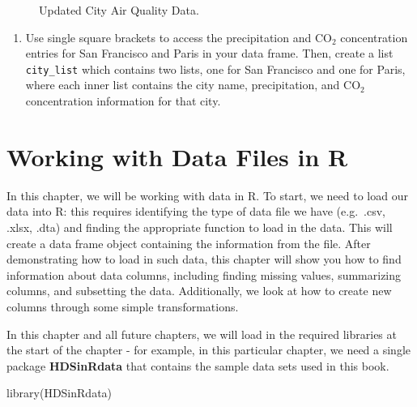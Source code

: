 \documentclass[
  letterpaper,
]{krantz}
\makeatletter
\newenvironment{Shaded}{\begin{snugshade}}{\end{snugshade}}
\newcommand{\FunctionTok}[1]{\textcolor[rgb]{0.28,0.35,0.67}{#1}}
\newcommand{\NormalTok}[1]{\textcolor[rgb]{0.00,0.23,0.31}{#1}}
\providecommand{\tightlist}{%
  \setlength{\itemsep}{0pt}\setlength{\parskip}{0pt}}\usepackage{longtable,booktabs,array}
\newenvironment{kframe}{%
\medskip{}
\setlength{\fboxsep}{.8em}
 \def\at@end@of@kframe{}%
 \ifinner\ifhmode%
  \def\at@end@of@kframe{\end{minipage}}%
  \begin{minipage}{\columnwidth}%
 \fi\fi%
 \def\FrameCommand##1{\hskip\@totalleftmargin \hskip-\fboxsep
 \colorbox{shadecolor}{##1}\hskip-\fboxsep
     \hskip-\linewidth \hskip-\@totalleftmargin \hskip\columnwidth}%
 \MakeFramed {\advance\hsize-\width
   \@totalleftmargin\z@ \linewidth\hsize
   \@setminipage}}%
 {\par\unskip\endMakeFramed%
 \at@end@of@kframe}
\renewenvironment{Shaded}{\begin{kframe}}{\end{kframe}}
\makeatother
\begin{document}
\begin{figure}


\caption{\label{fig-city-air-quality-2}Updated City Air Quality Data.}

\end{figure}%

\begin{enumerate}
\def\labelenumi{\arabic{enumi}.}
\setcounter{enumi}{3}
\tightlist
\item
  Use single square brackets to access the precipitation and
  \(\text{CO}_2\) concentration entries for San Francisco and Paris in
  your data frame. Then, create a list \texttt{city\_list} which
  contains two lists, one for San Francisco and one for Paris, where
  each inner list contains the city name, precipitation, and
  \(\text{CO}_2\) concentration information for that city.
\end{enumerate}

\chapter{Working with Data Files in R}\label{sec-data-files}

In this chapter, we will be working with data in R. To start, we need to
load our data into R: this requires identifying the type of data file we
have (e.g.~.csv, .xlsx, .dta) and finding the appropriate function to
load in the data. This will create a data frame object containing the
information from the file. After demonstrating how to load in such data,
this chapter will show you how to find information about data columns,
including finding missing values, summarizing columns, and subsetting
the data. Additionally, we look at how to create new columns through
some simple transformations.

In this chapter and all future chapters, we will load in the required
libraries at the start of the chapter - for example, in this particular
chapter, we need a single package \textbf{HDSinRdata} that contains the
sample data sets used in this book.

\begin{Shaded}
\begin{Highlighting}[]
\FunctionTok{library}\NormalTok{(HDSinRdata)}
\end{Highlighting}
\end{Shaded}
\end{document}
